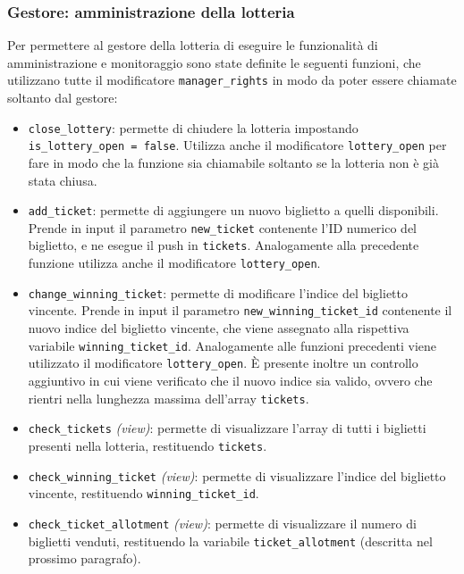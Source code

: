 \documentclass[12pt,a4paper,openright,twoside]{report}
\begin{document}
\subsubsection{Gestore: amministrazione della lotteria}
Per permettere al gestore della lotteria di eseguire le funzionalità di amministrazione e monitoraggio sono state definite le seguenti funzioni, che utilizzano tutte il modificatore \texttt{manager\_rights} in modo da poter essere chiamate soltanto dal gestore:
\begin{itemize}
    \item \texttt{close\_lottery}: permette di chiudere la lotteria impostando \texttt{is\_lottery\_open = false}. Utilizza anche il modificatore \texttt{lottery\_open} per fare in modo che la funzione sia chiamabile soltanto se la lotteria non è già stata chiusa.
    \item \texttt{add\_ticket}: permette di aggiungere un nuovo biglietto a quelli disponibili. Prende in input il parametro \texttt{new\_ticket} contenente l'ID numerico del biglietto, e ne esegue il push in \texttt{tickets}. Analogamente alla precedente funzione utilizza anche il modificatore \texttt{lottery\_open}.
    \item \texttt{change\_winning\_ticket}: permette di modificare l'indice del biglietto vincente. Prende in input il parametro \texttt{new\_winning\_ticket\_id} contenente il nuovo indice del biglietto vincente, che viene assegnato alla rispettiva variabile \texttt{winning\_ticket\_id}. Analogamente alle funzioni precedenti viene utilizzato il modificatore \texttt{lottery\_open}. È presente inoltre un controllo aggiuntivo in cui viene verificato che il nuovo indice sia valido, ovvero che rientri nella lunghezza massima dell'array \texttt{tickets}.
    \item \texttt{check\_tickets} \textit{(view)}: permette di visualizzare l'array di tutti i biglietti presenti nella lotteria, restituendo \texttt{tickets}.
    \item \texttt{check\_winning\_ticket} \textit{(view)}: permette di visualizzare l'indice del biglietto vincente, restituendo \texttt{winning\_ticket\_id}.
    \item \texttt{check\_ticket\_allotment} \textit{(view)}: permette di visualizzare il numero di biglietti venduti, restituendo la variabile \texttt{ticket\_allotment} (descritta nel prossimo paragrafo).
\end{itemize}
\end{document}
